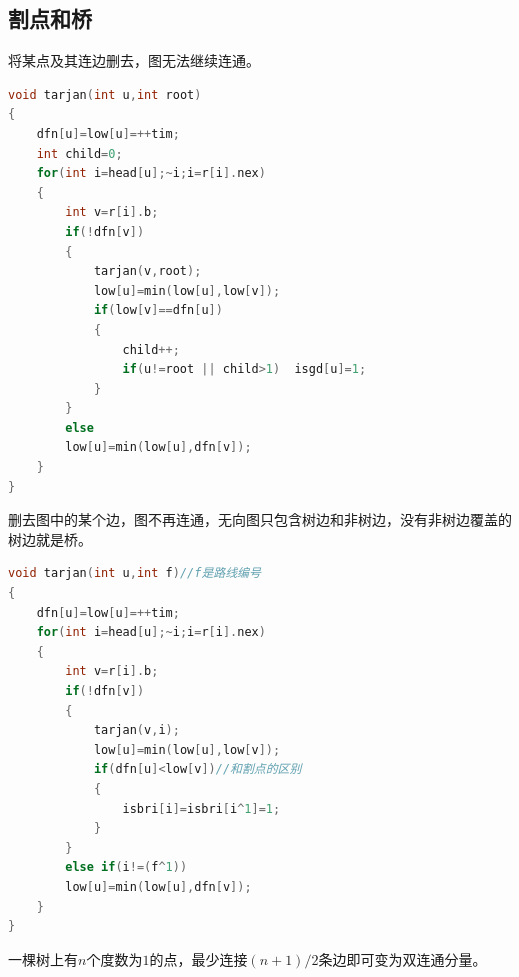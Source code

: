 \documentclass[a4paper]{book}
\begin{document}
\subsection{割点和桥}
将某点及其连边删去，图无法继续连通。
\begin{lstlisting}[language=C++,title=割点]
void tarjan(int u,int root)
{
    dfn[u]=low[u]=++tim;
    int child=0;
    for(int i=head[u];~i;i=r[i].nex)
    {
        int v=r[i].b;
        if(!dfn[v])
        {
            tarjan(v,root);
            low[u]=min(low[u],low[v]);
            if(low[v]==dfn[u])
            {
                child++;
                if(u!=root || child>1)	isgd[u]=1;
            }
        }
        else
        low[u]=min(low[u],dfn[v]);
    }
}
\end{lstlisting}
删去图中的某个边，图不再连通，无向图只包含树边和非树边，没有非树边覆盖的树边就是桥。
\begin{lstlisting}[language=C++,title=桥]
void tarjan(int u,int f)//f是路线编号
{
    dfn[u]=low[u]=++tim;
    for(int i=head[u];~i;i=r[i].nex)
    {
        int v=r[i].b;
        if(!dfn[v])
        {
            tarjan(v,i);
            low[u]=min(low[u],low[v]);
            if(dfn[u]<low[v])//和割点的区别
            {
                isbri[i]=isbri[i^1]=1;
            }
        }
        else if(i!=(f^1))
        low[u]=min(low[u],dfn[v]);
    }
}
\end{lstlisting}
一棵树上有$n$个度数为$1$的点，最少连接$(n+1)/2$条边即可变为双连通分量。
\end{document}
